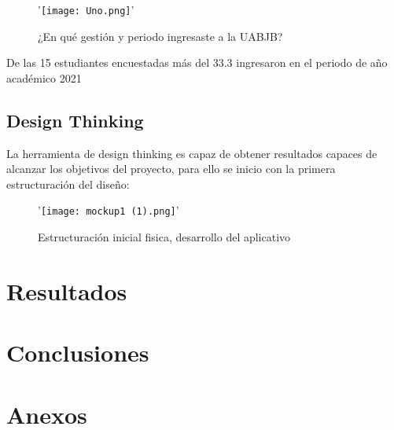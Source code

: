 \documentclass[hidelinks]{Documento}
\begin{document}
\begin{figure}[h]
\centering
'\texttt{[image: Uno.png]}'
\caption{¿En qué gestión y periodo ingresaste a la UABJB?}
\label{fig:Uno.png}
\end{figure}

De las 15 estudiantes encuestadas más del 33.3 ingresaron en el periodo de año académico 2021

\section{Design Thinking}

La herramienta de design thinking es capaz de obtener resultados capaces de alcanzar los objetivos del proyecto, para ello se inicio con la primera estructuración del diseño:

 \begin{figure}[h]
\centering
'\texttt{[image: mockup1 (1).png]}'
\caption{Estructuración inicial fisica, desarrollo del aplicativo}
\label{fig:Picture1.png}
\end{figure}


\chapter{Resultados}

\chapter{Conclusiones}

\backmatter
{}



\appendix
\chapter{Anexos}
\label{sec:anexos}
\end{document}

